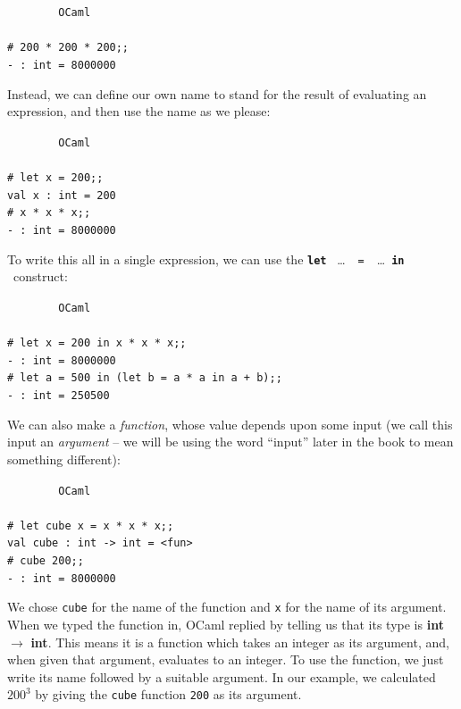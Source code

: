 \documentclass[]{book}
\newcommand{\smspace}{\vspace{4mm}}
\begin{document}
\smspace
\noindent\verb!        OCaml!\\
\noindent\\
\noindent\verb!# 200 * 200 * 200;;!\\
\noindent\verb!- : int = 8000000!
\smspace

\noindent Instead, we can define our own name to stand for the result of evaluating an expression, and then use the name as we please:

\smspace
\noindent\verb!        OCaml!\\
\noindent\\
\noindent\verb!# let x = 200;;!\\
\noindent\verb!val x : int = 200!\\
\noindent\verb!# x * x * x;;!\\
\noindent\verb!- : int = 8000000!
\smspace

\noindent To write this all in a single expression, we can use the \textbf{\texttt{let}} \ \ldots \ \ \texttt{=}\ \ \ldots \ \textbf{\texttt{in}}  \ construct:

\smspace
\noindent\verb!        OCaml!\\
\noindent\\
\noindent\verb!# let x = 200 in x * x * x;;!\\
\noindent\verb!- : int = 8000000!\\
\noindent\verb!# let a = 500 in (let b = a * a in a + b);;!\\
\noindent\verb!- : int = 250500!
\smspace

\noindent We can also make a \textit{function}, whose value depends upon some input (we call this input an \textit{argument} -- we will be using the word ``input'' later in the book to mean something different):

\smspace
\noindent\verb!        OCaml!\\
\noindent\\
\noindent\verb!# let cube x = x * x * x;;!\\
\noindent\verb!val cube : int -> int = <fun>!\\
\noindent\verb!# cube 200;;!\\
\noindent\verb!- : int = 8000000!
\smspace

\noindent We chose \texttt{cube} for the name of the function and \texttt{x} for the name of its argument. When we typed the function in, OCaml replied by telling us that its type is \index{$\rightarrow$}\textsf{\textbf{int} $\rightarrow$ \textbf{int}}. This means it is a function which takes an integer as its argument, and, when given that argument, evaluates to an integer. To use the function, we just write its name followed by a suitable argument. In our example, we calculated $200^3$ by giving the \texttt{cube} function \texttt{200} as its argument.
\end{document}
